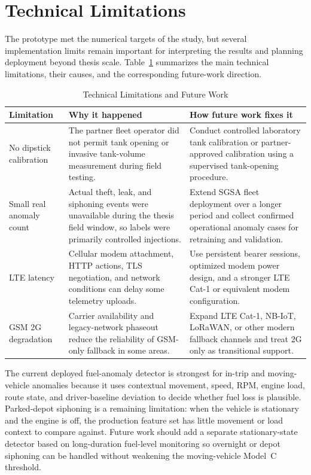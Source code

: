 \section{Technical Limitations}

The prototype met the numerical targets of the study, but several implementation limits remain important for interpreting the results and planning deployment beyond thesis scale. Table~\ref{tab:technical_limitations} summarizes the main technical limitations, their causes, and the corresponding future-work direction.

\begin{table}[!htbp]
\centering
\caption{Technical Limitations and Future Work}
\label{tab:technical_limitations}
\scriptsize
\setlength{\tabcolsep}{3pt}
\renewcommand{\arraystretch}{1.15}
\begin{tabularx}{\textwidth}{|p{}|X|X|}
\hline
\textbf{Limitation} & \textbf{Why it happened} & \textbf{How future work fixes it} \\
\hline
No dipstick calibration & The partner fleet operator did not permit tank opening or invasive tank-volume measurement during field testing. & Conduct controlled laboratory tank calibration or partner-approved calibration using a supervised tank-opening procedure. \\
\hline
Small real anomaly count & Actual theft, leak, and siphoning events were unavailable during the thesis field window, so labels were primarily controlled injections. & Extend SGSA fleet deployment over a longer period and collect confirmed operational anomaly cases for retraining and validation. \\
\hline
LTE latency & Cellular modem attachment, HTTP actions, TLS negotiation, and network conditions can delay some telemetry uploads. & Use persistent bearer sessions, optimized modem power design, and a stronger LTE Cat-1 or equivalent modem configuration. \\
\hline
GSM 2G degradation & Carrier availability and legacy-network phaseout reduce the reliability of GSM-only fallback in some areas. & Expand LTE Cat-1, NB-IoT, LoRaWAN, or other modern fallback channels and treat 2G only as transitional support. \\
\hline
\end{tabularx}
\normalsize
\end{table}

The current deployed fuel-anomaly detector is strongest for in-trip and moving-vehicle anomalies because it uses contextual movement, speed, RPM, engine load, route state, and driver-baseline deviation to decide whether fuel loss is plausible. Parked-depot siphoning is a remaining limitation: when the vehicle is stationary and the engine is off, the production feature set has little movement or load context to compare against. Future work should add a separate stationary-state detector based on long-duration fuel-level monitoring so overnight or depot siphoning can be handled without weakening the moving-vehicle Model~C threshold.

